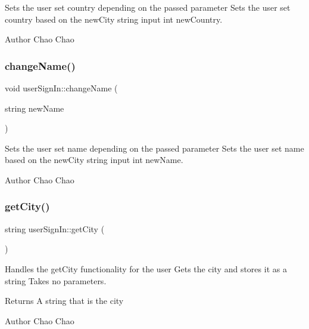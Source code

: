 Sets the user set country depending on the passed parameter  Sets the user set country based on the new\+City string input  int new\+Country. 

\begin{DoxyAuthor}{Author}
Chao Chao 
\end{DoxyAuthor}
\mbox{\label{classuser_sign_in_a2c60d720f5c473379048f7339faa3bf1}} 
\subsubsection{\texorpdfstring{change\+Name()}{changeName()}}
{\footnotesize\ttfamily void user\+Sign\+In\+::change\+Name (\begin{DoxyParamCaption}\item[{string}]{new\+Name }\end{DoxyParamCaption})}



Sets the user set name depending on the passed parameter  Sets the user set name based on the new\+City string input  int new\+Name. 

\begin{DoxyAuthor}{Author}
Chao Chao 
\end{DoxyAuthor}
\mbox{\label{classuser_sign_in_ac79d85051634716b43ff1cbc01df1433}} 
\subsubsection{\texorpdfstring{get\+City()}{getCity()}}
{\footnotesize\ttfamily string user\+Sign\+In\+::get\+City (\begin{DoxyParamCaption}{ }\end{DoxyParamCaption})}



Handles the get\+City functionality for the user  Gets the city and stores it as a string  Takes no parameters. 

\begin{DoxyReturn}{Returns}
A string that is the city 
\end{DoxyReturn}
\begin{DoxyAuthor}{Author}
Chao Chao 
\end{DoxyAuthor}
\mbox{\label{classuser_sign_in_a56eae654d96ddc6d8b948d3ba24bbcd9}} 
